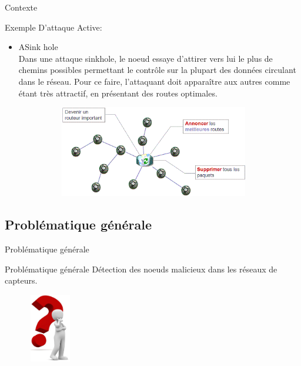 \documentclass[12pt, c]{beamer}
\begin{document}
	\begin{frame}{Contexte}
		\transwipe
		\vspace{-0.25cm}
		\begin{block}{Exemple D'attaque Active:}
			\begin{itemize}
				\item ASink hole \\ Dans une attaque sinkhole, le noeud essaye d'attirer vers lui le plus de chemins possibles permettant le contrôle sur la plupart des données circulant dans le réseau. Pour ce faire, l'attaquant doit apparaître aux autres comme étant très attractif, en présentant des routes optimales.
				\begin{figure}
		\begin{center}
		\includegraphics[width=10cm,height=4cm]{images/sinkhole.PNG}
		\end{center}
	\end{figure}
			\end{itemize}
		\end{block}
	\end{frame}
			

			
	\subsection{Problématique générale}		
			\begin{frame}{Problématique générale}
	\transglitter
				\begin{alertblock}{ Problématique générale}
					\large Détection des noeuds malicieux dans les réseaux de capteurs.
				\end{alertblock}
				\begin{figure}%
				\centering
				\includegraphics[width=2cm, height=3cm]{images/bonhomme_question.JPG}%
				\end{figure}
			\end{frame}	
						
\end{document}
